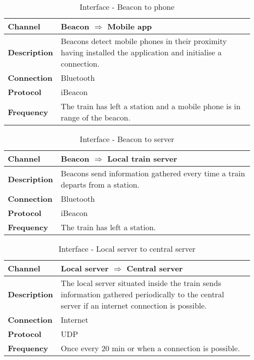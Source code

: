 \begin{table}[H]
  \centering
  \begin{tabularx}{\linewidth}{l|X}
    \textbf{Channel}      & Beacon $\Rightarrow$ Mobile app \\ \hline
    \textbf{Description}  & Beacons detect mobile phones in their proximity having installed the application and initialise a connection.\\ \hline
    \textbf{Connection}   & Bluetooth \\ \hline
    \textbf{Protocol}     & iBeacon \\ \hline
    \textbf{Frequency}    & The train has left a station and a mobile phone is in range of the beacon. \\ \hline
  \end{tabularx}
  \caption{Interface - Beacon to phone}
  \label{tbl:beacon_to_phone}
\end{table}

\begin{table}[H]
	\centering
	\begin{tabularx}{\linewidth}{l|X}
		\textbf{Channel}      & Beacon $\Rightarrow$ Local train server \\ \hline
		\textbf{Description}  & Beacons send information gathered every time a train departs from a station.\\ \hline
		\textbf{Connection}   & Bluetooth \\ \hline
		\textbf{Protocol}     & iBeacon \\ \hline
		\textbf{Frequency}    & The train has left a station. \\ \hline
	\end{tabularx}
	\caption{Interface - Beacon to server}
	\label{tbl:beacon_to_server}
\end{table}

\begin{table}[H]
	\centering
	\begin{tabularx}{\linewidth}{l|X}
		\textbf{Channel}      & Local server $\Rightarrow$ Central server \\ \hline
		\textbf{Description}  & The local server situated inside the train sends information gathered periodically to the central server if an internet connection is possible.\\ \hline
		\textbf{Connection}   & Internet \\ \hline
		\textbf{Protocol}     & UDP \\ \hline
		\textbf{Frequency}    & Once every 20 min or when a connection is possible. \\ \hline
	\end{tabularx}
	\caption{Interface - Local server to central server}
	\label{tbl:local_to_central}
\end{table}